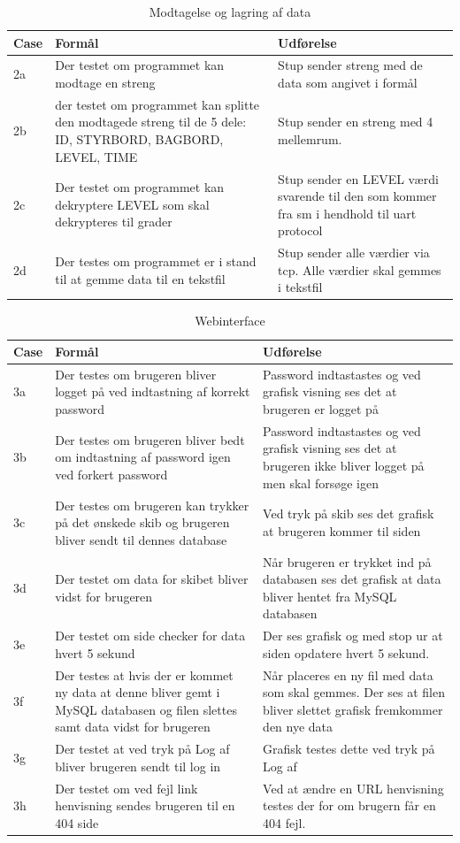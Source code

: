 \begin{table}[H]
\caption{Modtagelse og lagring af data}
\centering
\begin{tabular}{| p{1cm}  | p{4.5cm} | p{8cm} |}
\hline
Case &Formål &Udførelse\\\hline
2a &Der testet om programmet kan modtage en streng &Stup sender streng med de data som angivet i formål\\\hline
2b & der testet om programmet kan splitte den modtagede streng til de 5 dele: ID, STYRBORD, BAGBORD, LEVEL, TIME & Stup sender en streng med 4 mellemrum. \\\hline
2c &Der testet om programmet kan dekryptere LEVEL som skal dekrypteres til grader &Stup sender en LEVEL værdi svarende til den som kommer fra sm i hendhold til uart protocol\\\hline
2d &Der testes om programmet er i stand til at gemme data til en tekstfil &Stup sender alle værdier via tcp. Alle værdier skal gemmes i tekstfil\\\hline
\end{tabular}
\end{table}
\begin{table}[H]
\caption{Webinterface}
\centering
\begin{tabular}{| p{1cm}  | p{4.5cm} | p{8cm} |}
\hline
Case &Formål &Udførelse\\\hline
3a &Der testes om brugeren bliver logget på ved indtastning af korrekt password&Password indtastastes og ved grafisk visning ses det at brugeren er logget på\\\hline
3b &Der testes om brugeren bliver bedt om indtastning af password igen ved forkert password&Password indtastastes og ved grafisk visning ses det at brugeren ikke bliver logget på men skal forsøge igen\\\hline
3c &Der testes om brugeren kan trykker på det ønskede skib og brugeren bliver sendt til dennes database& Ved tryk på skib ses det grafisk at brugeren kommer til siden\\\hline
3d &Der testet om data for skibet bliver vidst for brugeren& Når brugeren er trykket ind på databasen ses det grafisk at data bliver hentet fra MySQL databasen\\\hline
3e &Der testet om side checker for data hvert 5 sekund& Der ses grafisk og med stop ur at siden opdatere hvert 5 sekund.\\\hline
3f &Der testes at hvis der er kommet ny data at denne bliver gemt i MySQL databasen og filen slettes samt data vidst for brugeren& Når placeres en ny fil med data som skal gemmes. Der ses at filen bliver slettet grafisk fremkommer den nye data\\\hline
3g &Der testet at ved tryk på Log af bliver brugeren sendt til log in & Grafisk testes dette ved tryk på Log af\\\hline
3h &Der testet om ved fejl link henvisning sendes brugeren til en 404 side & Ved at ændre en URL henvisning testes der for om brugern får en 404 fejl.\\\hline
\end{tabular}
\end{table}



